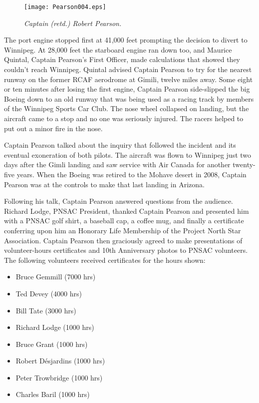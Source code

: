 \begin{figure}[htbp]
   \vspace{2em}
   \centering
   \texttt{[image: Pearson004.eps]}
   \caption*{\small \em Captain (retd.) Robert Pearson.}
   \label{fig:pearson004}
\end{figure}

The port engine stopped first at 41,000 feet prompting the decision to
divert to Winnipeg.  At 28,000 feet the starboard engine ran down too,
and Maurice Quintal, Captain Pearson's First Officer, made
calculations that showed they couldn't reach Winnipeg.  Quintal
advised Captain Pearson to try for the nearest runway on the former
RCAF aerodrome at Gimili, twelve miles away.  Some eight or ten
minutes after losing the first engine, Captain Pearson side-slipped
the big Boeing down to an old runway that was being used as a racing
track by members of the Winnipeg Sports Car Club. The nose wheel
collapsed on landing, but the aircraft came to a stop and no one was
seriously injured. The racers helped to put out a minor fire in the
nose.

Captain Pearson talked about the inquiry that followed the incident
and its eventual exoneration of both pilots.  The aircraft was flown
to Winnipeg just two days after the Gimli landing and saw service with
Air Canada for another twenty-five years.  When the Boeing was retired
to the Mohave desert in 2008, Captain Pearson was at the controls to
make that last landing in Arizona.

Following his talk, Captain Pearson answered questions from the
audience.  Richard Lodge, PNSAC President, thanked Captain Pearson and
presented him with a PNSAC golf shirt, a baseball cap, a coffee mug,
and finally a certificate conferring upon him an Honorary Life
Membership of the Project North Star Association.  Captain Pearson
then graciously agreed to make presentations of volunteer-hours
certificates and 10th Anniversary photos to PNSAC volunteers.  The
following volunteers received certificates for the hours shown:

\begin{itemize}
  \item Bruce Gemmill (7000 hrs)
  \item Ted Devey (4000 hrs)
  \item Bill Tate (3000 hrs)
  \item Richard Lodge (1000 hrs)
  \item Bruce Grant (1000 hrs)
  \item Robert D\'{e}sjardins (1000 hrs)
  \item Peter Trowbridge (1000 hrs)
  \item Charles Baril (1000 hrs)
\end{itemize}

